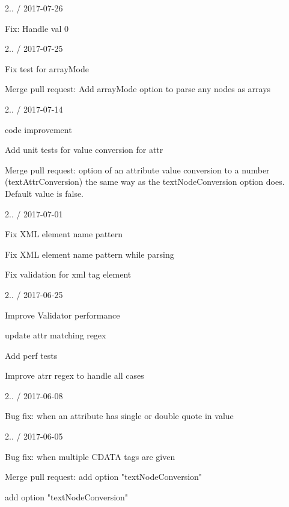 2.. / 2017-\/07-\/26
\begin{DoxyItemize}
\item Fix\+: Handle val 0
\end{DoxyItemize}

2.. / 2017-\/07-\/25
\begin{DoxyItemize}
\item Fix test for array\+Mode
\item Merge pull request\+: Add array\+Mode option to parse any nodes as arrays
\end{DoxyItemize}

2.. / 2017-\/07-\/14
\begin{DoxyItemize}
\item code improvement
\item Add unit tests for value conversion for attr
\item Merge pull request\+: option of an attribute value conversion to a number (text\+Attr\+Conversion) the same way as the text\+Node\+Conversion option does. Default value is false.
\end{DoxyItemize}

2.. / 2017-\/07-\/01
\begin{DoxyItemize}
\item Fix XML element name pattern
\item Fix XML element name pattern while parsing
\item Fix validation for xml tag element
\end{DoxyItemize}

2.. / 2017-\/06-\/25
\begin{DoxyItemize}
\item Improve Validator performance
\item update attr matching regex
\item Add perf tests
\item Improve atrr regex to handle all cases
\end{DoxyItemize}

2.. / 2017-\/06-\/08
\begin{DoxyItemize}
\item Bug fix\+: when an attribute has single or double quote in value
\end{DoxyItemize}

2.. / 2017-\/06-\/05
\begin{DoxyItemize}
\item Bug fix\+: when multiple CDATA tags are given
\item Merge pull request\+: add option "{}text\+Node\+Conversion"{}
\item add option "{}text\+Node\+Conversion"{}
\end{DoxyItemize}

